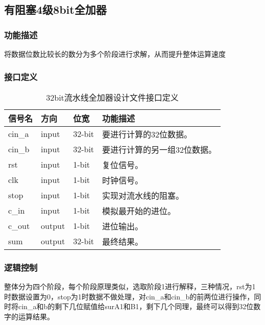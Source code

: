 \subsection{有阻塞4级8bit全加器}\label{sub:ctl}
\subsubsection{功能描述}
将数据位数比较长的数分为多个阶段进行求解，从而提升整体运算速度
\subsubsection{接口定义}
\begin{table}[htp]
	\caption{32bit流水线全加器设计文件接口定义}\label{tab:signaldef2}
	\begin{center}
		\begin{tabular}{|l|l|l|p{6cm}|}
		\hline
		\textbf{信号名} & \textbf{方向} & \textbf{位宽} & \textbf{功能描述}\\ \hline \hline
		cin\_a	& input	& 32-bit	& 要进行计算的32位数据。\\ \hline
		cin\_b	& input	& 32-bit	& 要进行计算的另一组32位数据。\\ \hline
		rst		& input	& 1-bit	& 复位信号。\\ \hline
		clk		& input	& 1-bit	& 时钟信号。\\ \hline
		stop	& input	& 1-bit	& 实现对流水线的阻塞。\\ \hline
		c\_in	& input	& 1-bit	& 模拟最开始的进位。\\ \hline
		c\_out	& output	& 1-bit	& 进位输出。\\ \hline
		sum		& output	& 32-bit	& 最终结果。\\ \hline
		\end{tabular}
	\end{center}
\end{table}
	
\subsubsection{逻辑控制}
整体分为四个阶段，每个阶段原理类似，选取阶段1进行解释，三种情况，rst为1时数据设置为0，stop为1时数据不做处理，对cin\_a和cin\_b的前两位进行操作，同时将cin\_a和b的剩下几位赋值给surA1和B1，剩下几个同理，最终可以得到32位数字的运算结果。